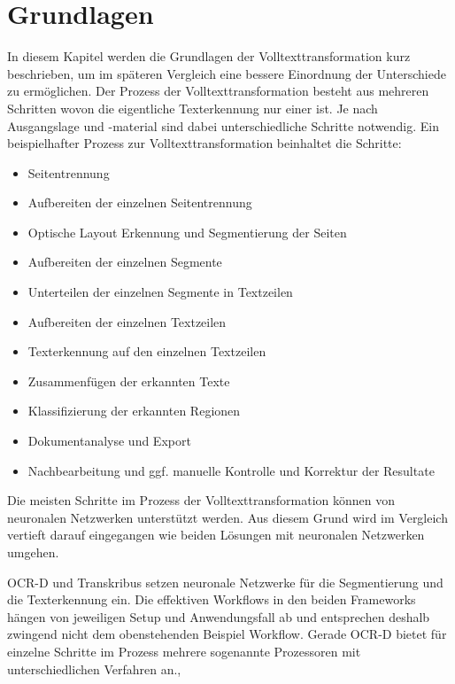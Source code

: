 \documentclass[a4paper,oneside, 12pt]{report}
\begin{document}
\chapter{Grundlagen}\label{sec:grundlagen}
In diesem Kapitel werden die Grundlagen der Volltexttransformation kurz beschrieben, um im späteren Vergleich eine bessere Einordnung der Unterschiede zu ermöglichen. Der Prozess der Volltexttransformation besteht aus mehreren Schritten wovon die eigentliche Texterkennung nur einer ist. Je nach Ausgangslage und -material sind dabei unterschiedliche Schritte notwendig. Ein beispielhafter Prozess zur Volltexttransformation beinhaltet die Schritte:
\begin{itemize}\itemsep=0.5pt
  \item Seitentrennung
  \item Aufbereiten der einzelnen Seitentrennung
  \item Optische Layout Erkennung und Segmentierung der Seiten
  \item Aufbereiten der einzelnen Segmente
  \item Unterteilen der einzelnen Segmente in Textzeilen
  \item Aufbereiten der einzelnen Textzeilen
  \item Texterkennung auf den einzelnen Textzeilen
  \item Zusammenfügen der erkannten Texte
  \item Klassifizierung der erkannten Regionen
  \item Dokumentanalyse und Export
  \item Nachbearbeitung und ggf. manuelle Kontrolle und Korrektur der Resultate
\end{itemize}

Die meisten Schritte im Prozess der Volltexttransformation können von neuronalen Netzwerken unterstützt werden. Aus diesem Grund wird im Vergleich vertieft darauf eingegangen wie beiden Lösungen mit neuronalen Netzwerken umgehen. 

OCR-D und Transkribus setzen neuronale Netzwerke für die Segmentierung und die Texterkennung ein. Die effektiven Workflows in den beiden Frameworks hängen von jeweiligen Setup und Anwendungsfall ab und entsprechen deshalb zwingend nicht dem obenstehenden Beispiel Workflow. Gerade OCR-D bietet für einzelne Schritte im Prozess mehrere sogenannte Prozessoren mit unterschiedlichen Verfahren an.\cite{transkribus}, \cite{ocrdworkflows} 
 
\end{document}
